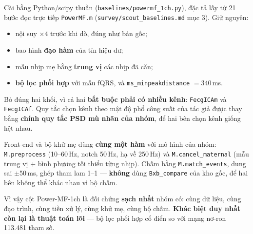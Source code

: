 \begin{ghichu}[title={Power-MF-1ch --- đối chứng công bằng nhất trong cả đề tài}]
Cài bằng Python/scipy thuần (\texttt{baselines/powermf\_1ch.py}), đặc tả lấy từ 21 bước đọc trực tiếp
\texttt{PowerMF.m} (\texttt{survey/scout\_baselines.md} mục 3). Giữ nguyên:
\begin{itemize}[leftmargin=1.5em,itemsep=2pt]
\item nội suy $\times 4$ trước khi dò, đúng như bản gốc;
\item bao hình \textbf{đạo hàm} của tín hiệu dư;
\item mẫu nhịp mẹ bằng \textbf{trung vị} các nhịp đã căn;
\item \textbf{bộ lọc phối hợp} với mẫu fQRS, và \texttt{ms\_minpeakdistance} $= 340$\,ms.
\end{itemize}
Bỏ đúng hai khối, vì cả hai \textbf{bắt buộc phải có nhiều kênh}: \texttt{FecgICAm} và
\texttt{FecgICAf}. Quy tắc chọn kênh theo mật độ phổ công suất của tác giả được thay bằng
\textbf{chính quy tắc PSD mù nhãn của nhóm}, để hai bên chọn kênh giống hệt nhau.

Front-end và bộ khử mẹ dùng \textbf{cùng một hàm} với mô hình của nhóm: \texttt{M.preprocess}
(10--60\,Hz, notch 50\,Hz, hạ về 250\,Hz) và \texttt{M.cancel\_maternal} (mẫu trung vị $+$ bình phương
tối thiểu từng nhịp). Chấm bằng \texttt{M.match\_events}, dung sai $\pm$50\,ms, ghép tham lam 1--1 ---
\textbf{không} dùng \texttt{Bxb\_compare} của kho gốc, để hai bên không thể khác nhau vì bộ chấm.

Vì vậy cột Power-MF-1ch là đối chứng \textbf{sạch nhất} nhóm có: cùng dữ liệu, cùng đạo trình, cùng tiền
xử lý, cùng khử mẹ, cùng bộ chấm. \textbf{Khác biệt duy nhất còn lại là thuật toán lõi} --- bộ lọc phối
hợp cổ điển so với mạng nơ-ron 113.481 tham số.
\end{ghichu}

